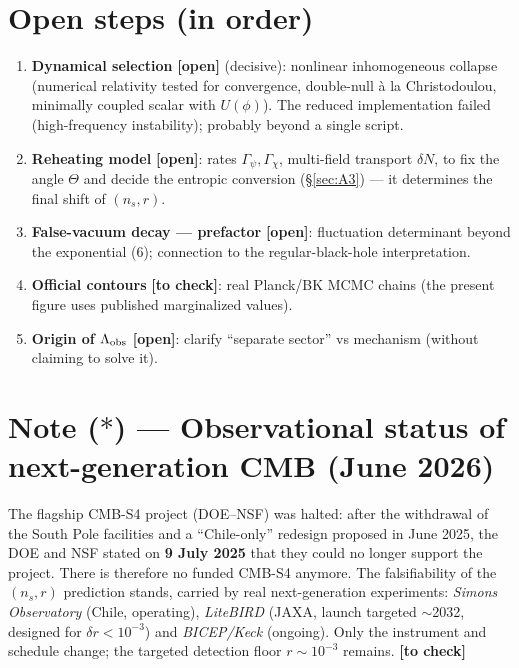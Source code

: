 \documentclass[11pt,a4paper]{article}
\newcommand{\st}[1]{\textbf{\textcolor{blue!45!black}{[#1]}}}
\begin{document}
\section{Open steps (in order)}
\begin{enumerate}[leftmargin=1.6em,itemsep=1pt]
\item \textbf{Dynamical selection} \st{open} (decisive): nonlinear inhomogeneous collapse (numerical relativity tested for convergence, double-null \`a la Christodoulou, minimally coupled scalar with $U(\phi)$). The reduced implementation failed (high-frequency instability); probably beyond a single script.
\item \textbf{Reheating model} \st{open}: rates $\Gamma_\psi,\Gamma_\chi$, multi-field transport $\delta N$, to fix the angle $\Theta$ and decide the entropic conversion (\S\ref{sec:A3}) --- it determines the final shift of $(n_s,r)$.
\item \textbf{False-vacuum decay --- prefactor} \st{open}: fluctuation determinant beyond the exponential (6); connection to the regular-black-hole interpretation.
\item \textbf{Official contours} \st{to check}: real Planck/BK MCMC chains (the present figure uses published marginalized values).
\item \textbf{Origin of $\Lambda_{\rm obs}$} \st{open}: clarify ``separate sector'' vs mechanism (without claiming to solve it).
\end{enumerate}

\section*{Note ($\ast$) --- Observational status of next-generation CMB (June 2026)}
\small The flagship CMB-S4 project (DOE--NSF) was halted: after the withdrawal of the South Pole facilities and a ``Chile-only'' redesign proposed in June 2025, the DOE and NSF stated on \textbf{9 July 2025} that they could no longer support the project. There is therefore no funded CMB-S4 anymore. The falsifiability of the $(n_s,r)$ prediction stands, carried by real next-generation experiments: \emph{Simons Observatory} (Chile, operating), \emph{LiteBIRD} (JAXA, launch targeted $\sim$2032, designed for $\delta r<10^{-3}$) and \emph{BICEP/Keck} (ongoing). Only the instrument and schedule change; the targeted detection floor $r\sim10^{-3}$ remains. \st{to check}
\normalsize
\end{document}
